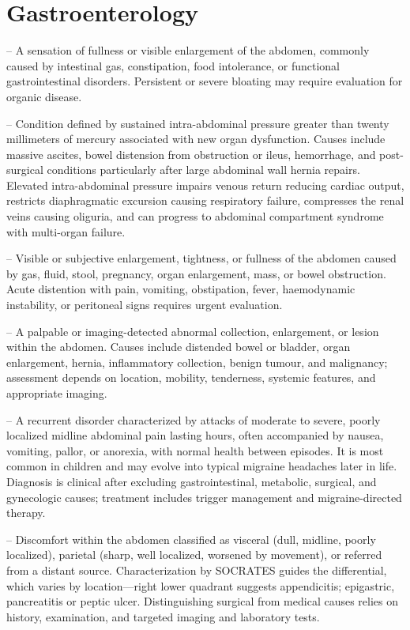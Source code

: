 \chapter{Gastroenterology}

-- A sensation of fullness or visible enlargement of the abdomen, commonly caused by intestinal gas, constipation, food intolerance, or functional gastrointestinal disorders. Persistent or severe bloating may require evaluation for organic disease.

-- Condition defined by sustained intra-abdominal pressure greater than twenty millimeters of mercury associated with new organ dysfunction. Causes include massive ascites, bowel distension from obstruction or ileus, hemorrhage, and post-surgical conditions particularly after large abdominal wall hernia repairs. Elevated intra-abdominal pressure impairs venous return reducing cardiac output, restricts diaphragmatic excursion causing respiratory failure, compresses the renal veins causing oliguria, and can progress to abdominal compartment syndrome with multi-organ failure.

-- Visible or subjective enlargement, tightness, or fullness of the abdomen caused by gas, fluid, stool, pregnancy, organ enlargement, mass, or bowel obstruction. Acute distention with pain, vomiting, obstipation, fever, haemodynamic instability, or peritoneal signs requires urgent evaluation.

-- A palpable or imaging-detected abnormal collection, enlargement, or lesion within the abdomen. Causes include distended bowel or bladder, organ enlargement, hernia, inflammatory collection, benign tumour, and malignancy; assessment depends on location, mobility, tenderness, systemic features, and appropriate imaging.

-- A recurrent disorder characterized by attacks of moderate to severe, poorly localized midline abdominal pain lasting hours, often accompanied by nausea, vomiting, pallor, or anorexia, with normal health between episodes. It is most common in children and may evolve into typical migraine headaches later in life. Diagnosis is clinical after excluding gastrointestinal, metabolic, surgical, and gynecologic causes; treatment includes trigger management and migraine-directed therapy.

-- Discomfort within the abdomen classified as visceral (dull, midline, poorly localized), parietal (sharp, well localized, worsened by movement), or referred from a distant source. Characterization by SOCRATES guides the differential, which varies by location---right lower quadrant suggests appendicitis; epigastric, pancreatitis or peptic ulcer. Distinguishing surgical from medical causes relies on history, examination, and targeted imaging and laboratory tests.

